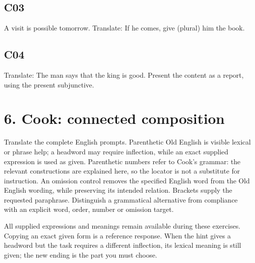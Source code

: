 \subsection*{C03}

A visit is possible tomorrow. Translate: If he comes, give (plural) him the book.


\subsection*{C04}

Translate: The man says that the king is good. Present the content as a report, using the present subjunctive.


\section*{6. Cook: connected composition}

Translate the complete English prompts. Parenthetic Old English is visible lexical or phrase help; a headword may require inflection, while an exact supplied expression is used as given. Parenthetic numbers refer to Cook’s grammar: the relevant constructions are explained here, so the locator is not a substitute for instruction. An omission control removes the specified English word from the Old English wording, while preserving its intended relation. Brackets supply the requested paraphrase. Distinguish a grammatical alternative from compliance with an explicit word, order, number or omission target.

All supplied expressions and meanings remain available during these exercises. Copying an exact given form is a reference response. When the hint gives a headword but the task requires a different inflection, its lexical meaning is still given; the new ending is the part you must choose.

